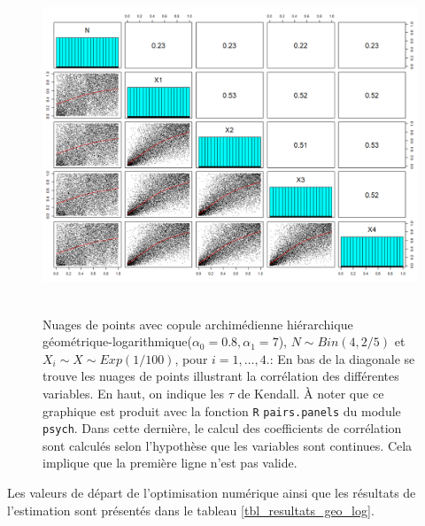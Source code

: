 \documentclass{article}
\begin{document}
	\begin{figure}[H]
		\centering
		\includegraphics[height=10cm]{Graph/scatterplot_geo_log.png}
		\caption[Nuages de points du scénario \ref{scenario_geo_log}]
		{Nuages de points avec copule archimédienne hiérarchique géométrique-logarithmique($\alpha_0=0.8, \alpha_1 = 7$), $N \sim Bin(4, 2/5)$ et $X_i \sim X \sim Exp(1/100)$, pour $i=1,\dots, 4$.:
			En bas de la diagonale se trouve les nuages de points illustrant la corrélation des différentes variables. En haut, on indique les $\tau$ de Kendall. À noter que ce graphique est produit avec la fonction \texttt{R} \texttt{pairs.panels} du module \texttt{psych}. Dans cette dernière, le calcul des coefficients de corrélation sont calculés selon l'hypothèse que les variables sont continues. Cela implique que la première ligne n'est pas valide.}
		\label{graph_scatterplot_geo_log}
	\end{figure}

	Les valeurs de départ de l'optimisation numérique ainsi que les résultats de l'estimation sont présentés dans le tableau \ref{tbl_resultats_geo_log}.
	
\end{document}
